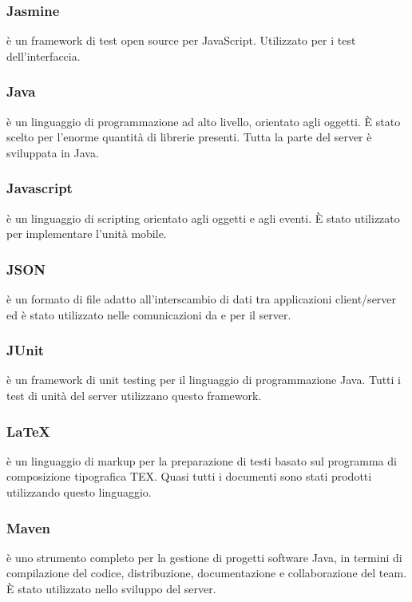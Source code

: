 	\subsubsection{Jasmine}
	 è un framework di test open source per JavaScript. Utilizzato per i test dell'interfaccia.
	
	\subsubsection{Java}
	 è un linguaggio di programmazione ad alto livello, orientato agli oggetti. È stato scelto per l'enorme quantità di librerie presenti. Tutta la parte del server è sviluppata in Java.
	
	\subsubsection{Javascript}
	 è un linguaggio di scripting orientato agli oggetti e agli eventi. È stato utilizzato per implementare l'unità mobile.
	
	\subsubsection{JSON}
	 è un formato di file adatto all'interscambio di dati tra applicazioni client/server ed è stato utilizzato nelle comunicazioni da e per il server.
	
	\subsubsection{JUnit}
	 è un framework di unit testing per il linguaggio di programmazione Java. Tutti i test di unità del server utilizzano questo framework.
	
	\subsubsection{LaTeX}
	 è un linguaggio di markup per la preparazione di testi basato sul programma di composizione tipografica TEX. Quasi tutti i documenti sono stati prodotti utilizzando questo linguaggio.
	
	\subsubsection{Maven}
	 è uno strumento completo per la gestione di progetti software Java, in termini di compilazione del codice, distribuzione, documentazione e collaborazione del team. È stato utilizzato nello sviluppo del server.
	
